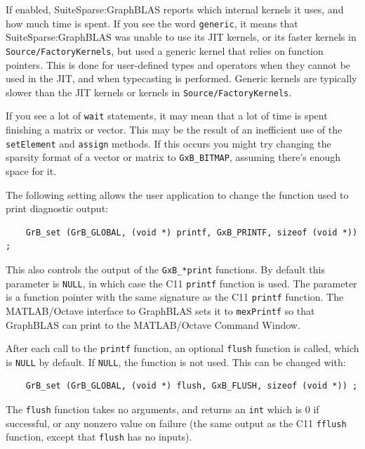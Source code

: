 If enabled, SuiteSparse:GraphBLAS reports which internal kernels it uses, and
how much time is spent.  If you see the word \verb'generic', it means that
SuiteSparse:GraphBLAS was unable to use its JIT kernels, or its faster kernels
in \verb'Source/FactoryKernels', but used a generic kernel that relies on
function pointers.  This is done for user-defined types and operators when they
cannot be used in the JIT, and when typecasting is performed.  Generic kernels
are typically slower than the JIT kernels or kernels in
\verb'Source/FactoryKernels'.

If you see a lot of \verb'wait' statements, it may mean that a lot of time is
spent finishing a matrix or vector.  This may be the result of an inefficient
use of the \verb'setElement' and \verb'assign' methods.  If this occurs you
might try changing the sparsity format of a vector or matrix to
\verb'GxB_BITMAP', assuming there's enough space for it.

The following setting allows the user application to change the
function used to print diagnostic output:

{\small
\begin{verbatim}
    GrB_set (GrB_GLOBAL, (void *) printf, GxB_PRINTF, sizeof (void *)) ; \end{verbatim} }

This also controls the output of the
\verb'GxB_*print' functions.  By default this parameter is \verb'NULL', in
which case the C11 \verb'printf' function is used.  The parameter is a
function pointer with the same signature as the C11 \verb'printf'
function.  The MATLAB/Octave interface to GraphBLAS sets it to \verb'mexPrintf'
so that GraphBLAS can print to the MATLAB/Octave Command Window.

After each call to the \verb'printf' function, an optional
\verb'flush' function is called, which is \verb'NULL' by default.  If
\verb'NULL', the function is not used.  This can be changed with:

{\small
\begin{verbatim}
    GrB_set (GrB_GLOBAL, (void *) flush, GxB_FLUSH, sizeof (void *)) ; \end{verbatim} }

The \verb'flush' function takes no
arguments, and returns an \verb'int' which is 0 if successful, or any nonzero
value on failure (the same output as the C11 \verb'fflush' function,
except that \verb'flush' has no inputs).

